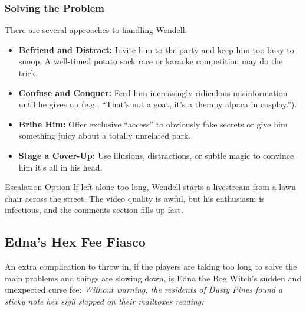 \subsubsection{Solving the Problem}
There are several approaches to handling Wendell:
\begin{itemize}
    \item \textbf{Befriend and Distract:} Invite him to the party and keep him too busy to snoop. A well-timed potato sack race or karaoke competition may do the trick.
    \item \textbf{Confuse and Conquer:} Feed him increasingly ridiculous misinformation until he gives up (e.g., “That’s not a goat, it’s a therapy alpaca in cosplay.”).
    \item \textbf{Bribe Him:} Offer exclusive “access” to obviously fake secrets or give him something juicy about a totally unrelated park.
    \item \textbf{Stage a Cover-Up:} Use illusions, distractions, or subtle magic to convince him it’s all in his head.
\end{itemize}

\begin{CommentBox}{Escalation Option}
    If left alone too long, Wendell starts a livestream from a lawn chair across the street. The video quality is awful, but his enthusiasm is infectious, and the comments section fills up fast.
\end{CommentBox}








\subsection{Edna's Hex Fee Fiasco}

An extra complication to throw in, if the players are taking too long to solve the main problems and things are slowing down, is Edna the Bog Witch’s sudden and unexpected curse fee: \emph{Without warning, the residents of Dusty Pines found a sticky note hex sigil slapped on their mailboxes reading:}
\begin{center}
\end{center}


